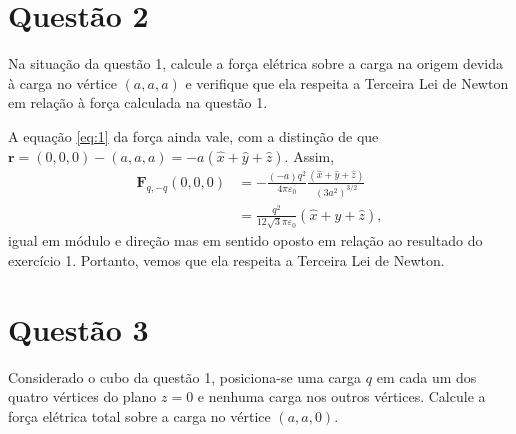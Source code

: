 \documentclass[11pt]{article}
\begin{document}
\section{Questão 2}
\label{sec:orgc045618}
Na situação da questão 1, calcule a força elétrica sobre a carga na
origem devida à carga no vértice  \((a,a,a)\) e verifique que ela respeita
a Terceira Lei de Newton em relação à força calculada na questão 1.

A equação \ref{eq:1} da força ainda vale, com a distinção de que \(\mathbf
r = (0,0,0) - (a,a,a) = -a(\hat x+\hat y+\hat z)\). Assim,
\begin{align*}
  \mathbf{F}_{q,-q}(0,0,0) &= -\frac{(-a)q^2}{4\pi\varepsilon_0}
                             \frac{(\hat x+\hat y+\hat z)}{(3a^2)^{3/2}}\\
                           &= \frac{q^2}{12\sqrt 3\pi\varepsilon_0}(\hat x+\hat y+\hat z),
\end{align*}
igual em módulo e direção mas em sentido oposto em relação ao resultado
do exercício 1. Portanto, vemos que ela respeita a Terceira Lei de Newton.
\section{Questão 3}
\label{sec:org03006c5}
Considerado o cubo da questão 1, posiciona-se uma carga \(q\) em cada um
dos quatro vértices do plano \(z=0\) e nenhuma carga nos outros
vértices. Calcule a força elétrica total sobre a carga no vértice
\((a,a,0)\).
\end{document}
